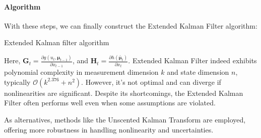 \paragraph*{Algorithm}
With these steps, we can finally construct the Extended Kalman Filter algorithm:
\begin{algorithm}[H]
    \caption{Extended Kalman filter algorithm}
        \begin{algorithmic}[1]
             
              
            \State{}
        \end{algorithmic}
\end{algorithm}
Here, $\mathbf{G}_t=\frac{\partial g(u_t,\boldsymbol{\mu}_{t-1})}{\partial x_{t-1}}$, and $\mathbf{H}_t=\frac{\partial h(\bar{\boldsymbol{\mu}}_t)}{\partial x_t}$. 
Extended Kalman Filter indeed exhibits polynomial complexity in measurement dimension $k$ and state dimension $n$, typically $\mathcal{O}(k^{2.376} + n^2)$. 
However, it's not optimal and can diverge if nonlinearities are significant. 
Despite its shortcomings, the Extended Kalman Filter often performs well even when some assumptions are violated.

As alternatives, methods like the Unscented Kalman Transform are employed, offering more robustness in handling nonlinearity and uncertainties.